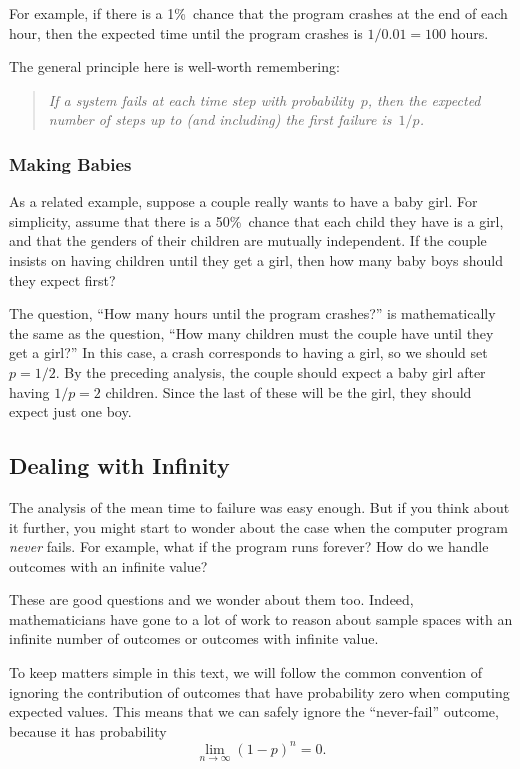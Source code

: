 For example, if there is a 1\%~chance that the program crashes at the
end of each hour, then the expected time until the program crashes is
$1 / 0.01 = 100$ hours.

The general principle here is well-worth remembering: 
\begin{quote}
\textit{If a system fails at each time step with probability~$p$, then
  the expected number of steps up to (and including) the first failure
  is~$1/p$.}
\end{quote}

\subsubsection{Making Babies}

As a related example, suppose a couple really wants to have a baby
girl.  For simplicity, assume that there is a 50\%~chance that each
child they have is a girl, and that the genders of their children are
mutually independent.  If the couple insists on having children until
they get a girl, then how many baby boys should they expect first?

The question, ``How many hours until the program crashes?'' is
mathematically the same as the question, ``How many children must the
couple have until they get a girl?''  In this case, a crash
corresponds to having a girl, so we should set $p = 1/2$.  By the
preceding analysis, the couple should expect a baby girl after having
$1/p = 2$ children.  Since the last of these will be the girl, they
should expect just one boy.

\subsection{Dealing with Infinity}

The analysis of the mean time to failure was easy enough.  But if you
think about it further, you might start to wonder about the case when
the computer program \emph{never} fails.  For example, what if the
program runs forever?  How do we handle outcomes with an infinite
value?

These are good questions and we wonder about them too.  Indeed,
mathematicians have gone to a lot of work to reason about sample
spaces with an infinite number of outcomes or outcomes with infinite
value.

To keep matters simple in this text, we will follow the common
convention of ignoring the contribution of outcomes that have
probability zero when computing expected values.  This means that we
can safely ignore the ``never-fail'' outcome, because it has
probability
\begin{equation*}
    \lim_{n \to \infty} (1 - p)^n = 0.
\end{equation*}

